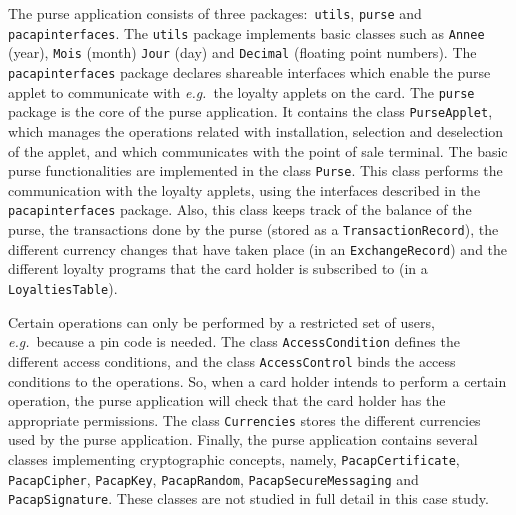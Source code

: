 \documentclass[a4paper]{llncs}
\begin{document}
The purse application consists of three packages$:$ \texttt{utils},
\texttt{purse} and \texttt{pacap\-interfaces}. The {\tt utils} package
implements basic classes such as \texttt{Annee} (year), 
\texttt{Mois} (month) \texttt{Jour} (day) and \texttt{Decimal}
(floating point numbers).  The \texttt{pacap\-interfaces} package
declares shareable interfaces which enable the purse applet to
communicate with \emph{e.g.}~the loyalty applets on the card.  The
\texttt{purse} package is the core of the purse application.  It
contains the class
\texttt{PurseApplet}, which manages the operations related with 
installation, selection and deselection of the applet, and which
communicates with the point of sale terminal.  The basic purse
functionalities are implemented in the class
\texttt{Purse}. This class performs the communication
with the loyalty applets, using the interfaces described in the
\texttt{pacapinterfaces} package.  Also, this class keeps track of the 
balance of the purse, the transactions done by the purse (stored as a
\texttt{TransactionRecord}), the different currency changes that have
taken place (in an \texttt{ExchangeRecord}) and the different
loyalty programs that the card holder is subscribed to (in a
\texttt{LoyaltiesTable}). 


Certain operations can only be performed by a restricted set of users,
\emph{e.g.}~because a pin code is needed.
The class \texttt{AccessCondition} defines the different access
conditions, and the class \texttt{AccessControl} binds the access conditions
to the operations. So, when a card holder intends to perform a certain
operation, the purse application will check that the card holder has
the appropriate permissions. %
The class \texttt{Currencies} stores the different currencies used by
the purse application.  Finally, the purse application contains several classes
implementing cryptographic concepts, namely, \texttt{PacapCertificate},
\texttt{PacapCipher}, \texttt{PacapKey}, \texttt{PacapRandom},
\texttt{PacapSecureMessaging} and \texttt{PacapSignature}. These
classes are not studied in full detail in this case study.
\end{document}

